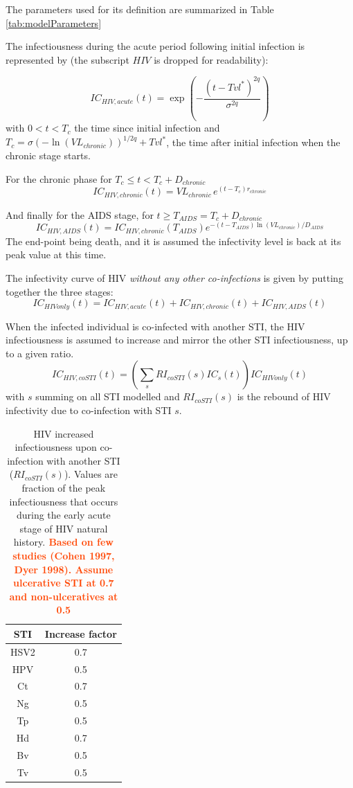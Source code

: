 \documentclass[11pt, onecolumn]{article}
\newcommand{\warning}[1]{\textbf{\textcolor{OrangeRed}{#1}}}
\begin{document}
The parameters used for its definition are summarized in Table \ref{tab:modelParameters}

The infectiousness during the acute period following initial infection is represented by (the subscript $HIV$ is dropped for readability):

$$IC_{HIV,acute}(t) = \exp\left( -\frac{(t-Tvl^*)^{2q}}{\sigma^{2q}} \right)$$
with $ 0<t<T_c$ the time since initial infection and $T_c = \sigma (-\ln(VL_{chronic}))^{1/2q} + Tvl^*$, the time after initial infection when the chronic stage starts.

For the chronic phase for $T_c\leq t < T_c+D_{chronic}$
$$ IC_{HIV,chronic}(t) = VL_{chronic} \, e^{(t-T_c)r_{chronic}} $$

And finally for the AIDS stage, for $ t \geq T_{AIDS}= T_c+D_{chronic}$
$$IC_{HIV,AIDS}(t) = IC_{HIV,chronic}(T_{AIDS}) e^{-(t-T_{AIDS}) \ln(VL_{chronic})/D_{AIDS}}$$
The end-point being death, and it is assumed the infectivity level is back at its peak value at this time.

The infectivity curve of HIV \emph{without any other co-infections} is given by putting together the three stages:
$$ IC_{HIVonly}(t) = IC_{HIV,acute}(t)+IC_{HIV,chronic}(t)+IC_{HIV,AIDS}(t)$$

When the infected individual is co-infected with another STI, the HIV infectiousness is assumed to increase and mirror the other STI infectiousness, up to a given ratio.
$$IC_{HIV,coSTI}(t) = \left(\sum_s RI_{coSTI}(s) IC_{s}(t)\right)  IC_{HIVonly}(t) $$
with $s$ summing on all STI modelled and $RI_{coSTI}(s)$ is the rebound of HIV infectivity due to co-infection with STI $s$.

\begin{table}[htdp]
\begin{center}
\begin{tabular}{|c|c|}
\hline
STI & Increase factor \\
\hline
HSV2 & 0.7\\
HPV & 0.5\\
Ct & 0.7\\
Ng & 0.5\\
Tp & 0.5\\
Hd & 0.7\\
Bv & 0.5\\
Tv & 0.5\\
\hline
\end{tabular}
\end{center}
\caption{HIV increased infectiousness upon co-infection with another STI ($RI_{coSTI}(s)$). Values are fraction of the peak infectiousness that occurs during the early acute stage of HIV natural history.\warning{ Based on few studies (Cohen 1997, Dyer 1998). Assume ulcerative STI at 0.7 and non-ulceratives at 0.5}}
\label{Table:rebound}
\end{table}%
\end{document}

